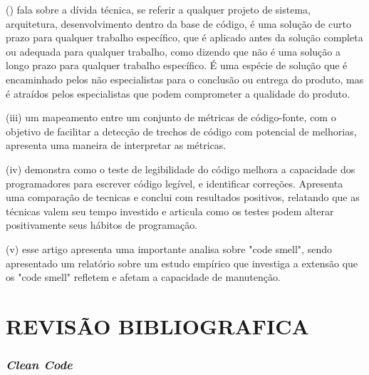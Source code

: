 \documentclass[12pt]{article}
\begin{document}
 () \cite{TR_QC_TECHNICAL_DEBT} fala sobre a dívida técnica, se referir a qualquer projeto de sistema, arquitetura, desenvolvimento dentro da base de código, é uma solução de curto prazo para qualquer trabalho específico, que é aplicado antes da solução completa ou adequada para
qualquer trabalho, como dizendo que não é uma solução a longo prazo para qualquer trabalho específico. É uma espécie de solução que é encaminhado pelos não especialistas para o conclusão ou entrega do produto, mas é atraídos pelos especialistas que podem comprometer a qualidade do produto.

 (iii) \cite{TR_CLEAN_CODE_METRICA} um mapeamento entre um conjunto de métricas de código-fonte, com o objetivo de facilitar a detecção de trechos de código com potencial de melhorias, apresenta uma maneira de interpretar as métricas.

 (iv) \cite{CODE_READABILITY_TESTING_STUDY} demonstra
como o teste de legibilidade do código melhora a capacidade dos programadores
para escrever código legível, e identificar correções. Apresenta uma comparação de tecnicas e conclui com resultados positivos, relatando que as técnicas valem seu tempo investido e articula como os testes podem alterar positivamente seus hábitos de programação.
 
 (v) \cite{CODE_SMELLS_REFLECT_IMPORTANT_MAINTAINABILITY_ASPECTS} esse artigo apresenta uma importante analisa sobre "code smell", sendo apresentado um relatório sobre um estudo empírico que investiga a extensão que os "code smell" refletem e afetam a capacidade de manutenção.

\part{REVISÃO BIBLIOGRAFICA} \label{sec:revisaobibliografica}

\section{\textit{Clean Code}} \label{sec:cleancode}
\end{document}
